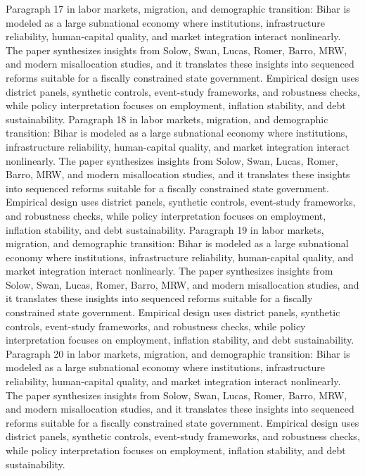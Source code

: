 \documentclass[preprint,12pt]{elsarticle}
\begin{document}
Paragraph 17 in labor markets, migration, and demographic transition: Bihar is modeled as a large subnational economy where institutions, infrastructure reliability, human-capital quality, and market integration interact nonlinearly. The paper synthesizes insights from Solow, Swan, Lucas, Romer, Barro, MRW, and modern misallocation studies, and it translates these insights into sequenced reforms suitable for a fiscally constrained state government. Empirical design uses district panels, synthetic controls, event-study frameworks, and robustness checks, while policy interpretation focuses on employment, inflation stability, and debt sustainability.
Paragraph 18 in labor markets, migration, and demographic transition: Bihar is modeled as a large subnational economy where institutions, infrastructure reliability, human-capital quality, and market integration interact nonlinearly. The paper synthesizes insights from Solow, Swan, Lucas, Romer, Barro, MRW, and modern misallocation studies, and it translates these insights into sequenced reforms suitable for a fiscally constrained state government. Empirical design uses district panels, synthetic controls, event-study frameworks, and robustness checks, while policy interpretation focuses on employment, inflation stability, and debt sustainability.
Paragraph 19 in labor markets, migration, and demographic transition: Bihar is modeled as a large subnational economy where institutions, infrastructure reliability, human-capital quality, and market integration interact nonlinearly. The paper synthesizes insights from Solow, Swan, Lucas, Romer, Barro, MRW, and modern misallocation studies, and it translates these insights into sequenced reforms suitable for a fiscally constrained state government. Empirical design uses district panels, synthetic controls, event-study frameworks, and robustness checks, while policy interpretation focuses on employment, inflation stability, and debt sustainability.
Paragraph 20 in labor markets, migration, and demographic transition: Bihar is modeled as a large subnational economy where institutions, infrastructure reliability, human-capital quality, and market integration interact nonlinearly. The paper synthesizes insights from Solow, Swan, Lucas, Romer, Barro, MRW, and modern misallocation studies, and it translates these insights into sequenced reforms suitable for a fiscally constrained state government. Empirical design uses district panels, synthetic controls, event-study frameworks, and robustness checks, while policy interpretation focuses on employment, inflation stability, and debt sustainability.
\end{document}
